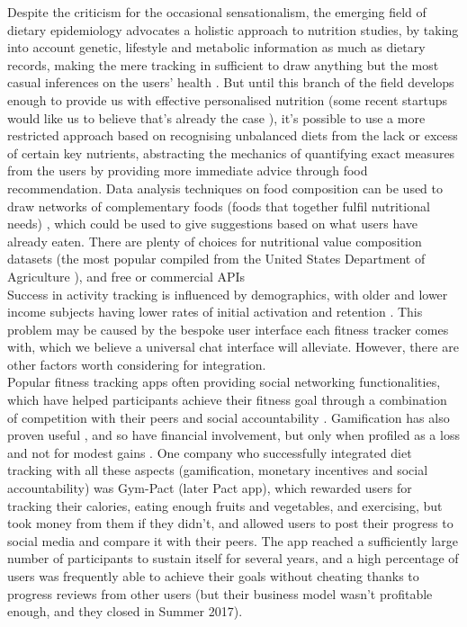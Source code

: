 Despite the criticism for the occasional sensationalism, the emerging field of dietary epidemiology advocates a holistic approach to nutrition studies, by taking into account genetic, lifestyle and metabolic information as much as dietary records, making the mere tracking in sufficient to draw anything but the most casual inferences on the users' health \cite{byers2001food}. But until this branch of the field develops enough to provide us with effective personalised nutrition (some recent startups would like us to believe that's already the case \cite{habitwebsite}), it's possible to use a more restricted approach based on recognising unbalanced diets from the lack or excess of certain key nutrients, abstracting the mechanics of quantifying exact measures from the users by providing more immediate advice through food recommendation. Data analysis techniques on food composition can be used to draw networks of complementary foods (foods that together fulfil nutritional needs) \cite{Kim2015a}, which could be used to give suggestions based on what users have already eaten. There are plenty of choices for nutritional value composition datasets (the most popular compiled from the United States Department of Agriculture \cite{usda}), and free or commercial APIs \cite{foodapis}\\
Success in activity tracking is influenced by demographics, with older and lower income subjects having lower rates of initial activation and retention \cite{Patel2017}. This problem may be caused by the bespoke user interface each fitness tracker comes with, which we believe a universal chat interface will alleviate. However, there are other factors worth considering for integration. \\
Popular fitness tracking apps often providing social networking functionalities, which have helped participants achieve their fitness goal through a combination of competition with their peers and social accountability \cite{chenchen2014}. Gamification has also proven useful \cite{doi:10.1001/jamainternmed.2017.3458}, and so have financial involvement, but only when profiled as a loss and not for modest gains \cite{doi:10.7326/M15-1635}. One company who successfully integrated diet tracking with all these aspects (gamification, monetary incentives and social accountability) was Gym-Pact (later Pact app), which rewarded users for tracking their calories, eating enough fruits and vegetables, and exercising, but took money from them if they didn't, and allowed users to post their progress to social media and compare it with their peers. The app reached a sufficiently large number of participants \cite{nudgingpracticioner} to sustain itself for several years, and a high percentage of users was frequently able to achieve their goals without cheating thanks to progress reviews from other users (but their business model wasn't profitable enough, and they closed in Summer 2017).
